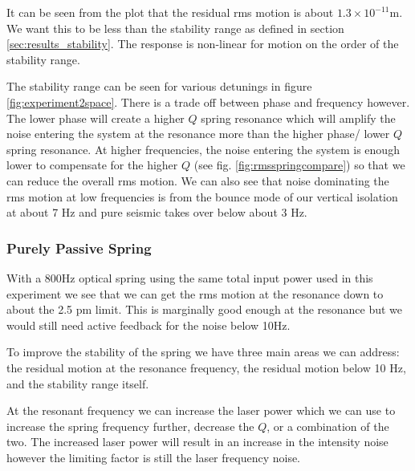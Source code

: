 It can be seen from the plot that the residual \ac{rms} motion is about
$1.3\times 10^{-11} \mathrm{m}$.
We want this to be less than the stability range as defined in
section \ref{sec:results_stability}.
The response is non-linear for motion on the order of the stability range.


The stability range can be seen for various detunings in figure
\ref{fig:experiment2space}.
There is a trade off between phase and frequency however.
The lower phase will create a higher $Q$ spring resonance which will amplify the
noise entering the system at the resonance more than the higher phase/
lower $Q$ spring resonance.
At higher frequencies, the noise entering the system is enough lower to
compensate for the higher $Q$ (see fig. \ref{fig:rmsspringcompare})
so that we can reduce the overall rms motion.
We can also see that noise dominating the \ac{rms} motion at low frequencies
is from the bounce mode of our vertical isolation at about 7 Hz and
pure seismic takes over below about 3 Hz.

\subsubsection{Purely Passive Spring}
\label{sec:results2imp}

With a 800Hz optical spring using the same total input power used in this
experiment we see that we can get the \ac{rms} motion at
the resonance down to about the 2.5 pm limit.
This is marginally good enough at the resonance but we would still need active
feedback for the noise below 10Hz.

To improve the stability of the spring we have three main areas we can address:
the residual motion at the resonance frequency, the residual motion below 10
Hz, and the stability range itself.

At the resonant frequency we can
increase the laser power which we can use to increase the
spring frequency further, decrease the $Q$, or a combination
of the two.
The increased laser power will result in an increase in the intensity
noise however the limiting factor is still the laser frequency noise.

